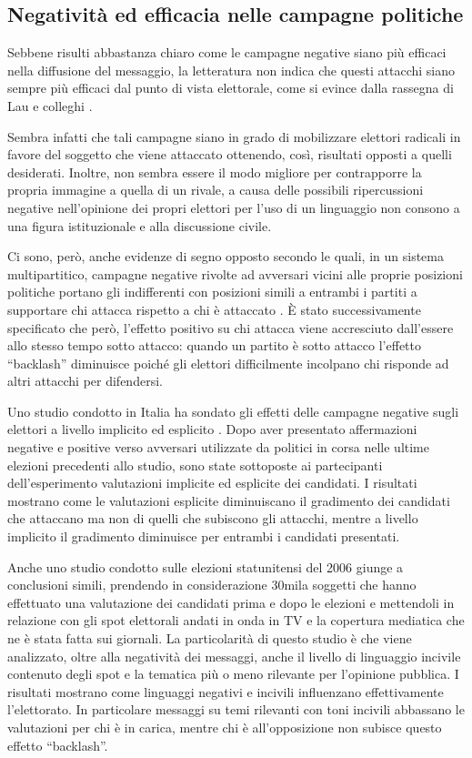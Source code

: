 \subsection{Negatività ed efficacia nelle campagne politiche}
Sebbene risulti abbastanza chiaro come le campagne negative siano più efficaci nella diffusione del messaggio, la letteratura non indica che questi attacchi siano sempre più efficaci dal punto di vista elettorale, come si evince dalla rassegna di Lau e colleghi \citep{lau2007}.

Sembra infatti che tali campagne siano in grado di mobilizzare elettori radicali in favore del soggetto che viene attaccato \citep{anso1995} ottenendo, così, risultati opposti a quelli desiderati. Inoltre, non sembra essere il modo migliore per contrapporre la propria immagine a quella di un rivale, a causa delle possibili ripercussioni negative nell'opinione dei propri elettori per l’uso di un linguaggio non consono a una figura istituzionale e alla discussione civile.

Ci sono, però, anche evidenze di segno opposto secondo le quali, in un sistema multipartitico, campagne negative rivolte ad avversari vicini alle proprie posizioni politiche portano gli indifferenti con posizioni simili a entrambi i partiti a supportare chi attacca rispetto a chi è attaccato \citep{curini2010}. È stato successivamente specificato  \citep{ceron2016} che però, l’effetto positivo su chi attacca viene accresciuto dall’essere allo stesso tempo sotto attacco: quando un partito è sotto attacco l’effetto “backlash” diminuisce poiché gli elettori difficilmente incolpano chi risponde ad altri attacchi per difendersi.

Uno studio condotto in Italia ha sondato gli effetti delle campagne negative sugli elettori a livello implicito ed esplicito \citep{carraro2010}. Dopo aver presentato affermazioni negative e positive verso avversari utilizzate da politici in corsa nelle ultime elezioni precedenti allo studio, sono state sottoposte ai partecipanti dell’esperimento valutazioni implicite ed esplicite dei candidati. I risultati mostrano come le valutazioni esplicite diminuiscano il gradimento dei candidati che attaccano ma non di quelli che subiscono gli attacchi, mentre a livello implicito il gradimento diminuisce per entrambi i candidati presentati.

Anche uno studio condotto sulle elezioni statunitensi \citep{fridkin2011} del 2006 giunge a conclusioni simili, prendendo in considerazione 30mila soggetti che hanno effettuato una valutazione dei candidati prima e dopo le elezioni e mettendoli in relazione con gli spot elettorali andati in onda in TV e la copertura mediatica che ne è stata fatta sui giornali. La particolarità di questo studio è che viene analizzato, oltre alla negatività dei messaggi, anche il livello di linguaggio incivile contenuto degli spot e la tematica più o meno rilevante per l’opinione pubblica. I risultati mostrano come linguaggi negativi e incivili influenzano effettivamente l’elettorato. In particolare messaggi su temi rilevanti con toni incivili abbassano le valutazioni per chi è in carica, mentre chi è all’opposizione non subisce questo effetto “backlash”.

